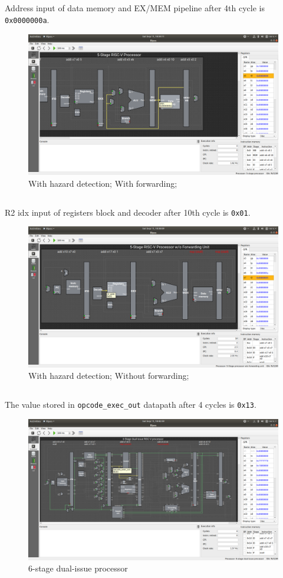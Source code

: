 \documentclass[12pt, fleqn]{article}
\begin{document}
\subsection{}
Address input of data memory and EX/MEM pipeline after 4th cycle is \verb!0x0000000a!.
\begin{figure}[H]
  \centering
  \includegraphics[scale=0.22]{Q3/hf_datapath.png}
  \caption{With hazard detection; With forwarding;}
\end{figure}

\subsection{}
R2 idx input of registers block and decoder after 10th cycle is \verb!0x01!.
\begin{figure}[H]
  \centering
  \includegraphics[scale=0.22]{Q3/hnf_datapath.png}
  \caption{With hazard detection; Without forwarding;}
\end{figure}

\subsection{}
The value stored in \verb!opcode_exec_out! datapath after 4 cycles is \verb!0x13!.
\begin{figure}[H]
  \centering
  \includegraphics[scale=0.22]{Q3/6di_datapath.png}
  \caption{6-stage dual-issue processor}
\end{figure}
\end{document}
